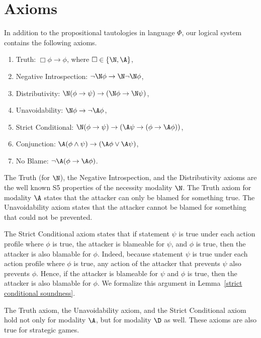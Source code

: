 \documentclass[letterpaper]{article}
\begin{document}
\section{Axioms}\label{axioms section}

In addition to the propositional tautologies in  language $\Phi$, our logical system contains the following axioms.


\begin{enumerate}
\item Truth: $\Box\phi\to\phi$, where $\Box\in\{\N,\A\}$,
\item Negative Introspection: $\neg\N\phi\to\N\neg\N\phi$,
\item Distributivity: 
$\N(\phi\to\psi)\to(\N\phi\to\N\psi)$,
\item Unavoidability: $\N\phi\to\neg\A\phi$,
\item Strict Conditional:  $\N(\phi\to\psi)\to(\A\psi\to(\phi\to \A\phi))$,
\item Conjunction: $\A(\phi\wedge\psi)\to(\A\phi\vee\A\psi)$,
\item No Blame: $\neg\A(\phi\to\A\phi)$.
\end{enumerate}

The Truth (for $\N$), the Negative Introspection, and the Distributivity axioms are the well known S5 properties of the necessity modality $\N$. The Truth axiom for modality $\A$ states that the attacker can only be blamed for something true. The Unavoidability axiom states that the attacker cannot be blamed for something that could not be prevented. 

The Strict Conditional axiom states that if statement $\psi$ is true under each action profile where $\phi$ is true, the attacker is blameable for $\psi$, and $\phi$ is true, then the attacker is also blamable for $\phi$. Indeed, because statement $\psi$ is true under each action profile where $\phi$ is true, any action of the attacker that prevents $\psi$ also prevents $\phi$. Hence, if the attacker is blameable for $\psi$ and $\phi$ is true, then the attacker is also blamable for $\phi$. We formalize this argument in Lemma~\ref{strict conditional soundness}.

The Truth axiom, the Unavoidability axiom, and the Strict Conditional axiom hold not only for modality $\A$, but for modality $\D$ as well. These axioms are also true for strategic games. 
\end{document}
